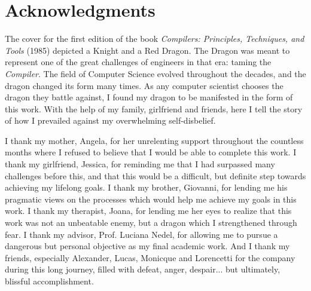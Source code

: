 \chapter*{Acknowledgments}

The cover for the first edition of the book \emph{Compilers: Principles, Techniques, and Tools} (1985) depicted a Knight and a Red Dragon. The Dragon was meant to represent one of the great challenges of engineers in that era: taming the \emph{Compiler}. The field of Computer Science evolved throughout the decades, and the dragon changed its form many times. As any computer scientist chooses the dragon they battle against, I found my dragon to be manifested in the form of this work. With the help of my family, girlfriend and friends, here I tell the story of how I prevailed against my overwhelming self-disbelief.

I thank my mother, Angela, for her unrelenting support throughout the countless months where I refused to believe that I would be able to complete this work. I thank my girlfriend, Jessica, for reminding me that I had surpassed many challenges before this, and that this would be a difficult, but definite step towards achieving my lifelong goals. I thank my brother, Giovanni, for lending me his pragmatic views on the processes which would help me achieve my goals in this work. I thank my therapist, Joana, for lending me her eyes to realize that this work was not an unbeatable enemy, but a dragon which I strengthened through fear. I thank my advisor, Prof. Luciana Nedel, for allowing me to pursue a dangerous but personal objective as my final academic work. And I thank my friends, especially Alexander, Lucas, Monicque and Lorencetti for the company during this long journey, filled with defeat, anger, despair... but ultimately, blissful accomplishment.